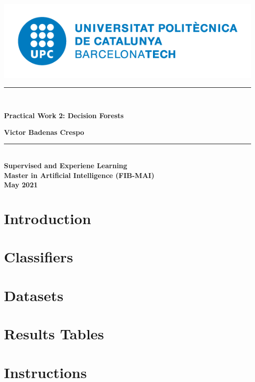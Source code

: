 \documentclass[oneside,11pt]{book}
\begin{document}
\titleformat{\chapter}[display]
{\normalfont\huge\bfseries}{\chaptertitlename\ \thechapter}{20pt}{\Huge}
\includegraphics[scale=.3]{upc-logo.png}
\begin{center}
\vspace*{2in}
\noindent\hfil\rule{17cm}{0.2mm}\hfil\\
\begin{Huge}
    \textbf{Practical Work 2: Decision Forests\\}
\end{Huge}
\vspace*{0.3in}
\begin{large}
    \textbf{Victor Badenas Crespo}
\end{large}
\noindent\hfil\rule{17cm}{0.2mm}\hfil\\
\vspace*{3in}
\textbf{Supervised and Experiene Learning\\}
\textbf{Master in Artificial Intelligence (FIB-MAI)\\}
\vspace*{0.2in}
\textbf{May 2021}

\end{center}
\thispagestyle{empty}
\clearpage

\tableofcontents
{}
\clearpage
{}

\chapter{Introduction}


\chapter{Classifiers}


\chapter{Datasets}


\chapter{Results Tables}


\chapter{Instructions}


\printbibliography
\end{document}
